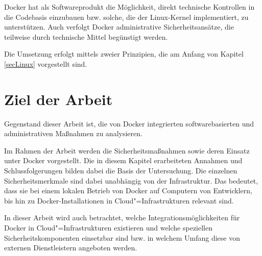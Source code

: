 \documentclass[../main.tex]{subfiles}
\begin{document}
    Docker hat als Softwareprodukt die Möglichkeit, direkt technische Kontrollen in die Codebasis einzubauen bzw. solche, die der Linux-Kernel implementiert, zu unterstützen. Auch verfolgt Docker administrative Sicherheitsansätze, die teilweise durch technische Mittel begünstigt werden.

    Die Umsetzung erfolgt mittels zweier Prinzipien, die am Anfang von Kapitel \ref{secLinux} vorgestellt sind.

  \section{Ziel der Arbeit}
    Gegenstand dieser Arbeit ist, die von Docker integrierten softwarebasierten und administrativen Maßnahmen zu analysieren.

    Im Rahmen der Arbeit werden die Sicherheitsmaßnahmen sowie deren Einsatz unter Docker vorgestellt. Die in diesem Kapitel erarbeiteten Annahmen und Schlussfolgerungen bilden dabei die Basis der Untersuchung. Die einzelnen Sicherheitsmerkmale sind dabei unabhängig von der Infrastruktur. Das bedeutet, dass sie bei einem lokalen Betrieb von Docker auf Computern von Entwicklern, bis hin zu Docker-Installationen in Cloud"=Infrastrukturen relevant sind.

    In dieser Arbeit wird auch betrachtet, welche Integrationsmöglichkeiten für Docker in Cloud"=Infrastrukturen existieren und welche speziellen Sicherheitskomponenten einsetzbar sind bzw. in welchem Umfang diese von externen Dienstleistern angeboten werden.





\end{document}
